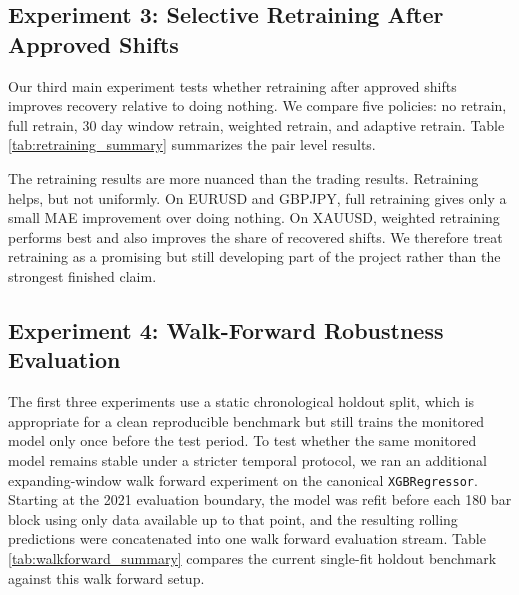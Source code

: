 \documentclass[11pt]{article}
\begin{document}
\subsection{Experiment 3: Selective Retraining After Approved Shifts}
Our third main experiment tests whether retraining after approved shifts improves recovery relative to doing nothing. We compare five policies: no retrain, full retrain, 30 day window retrain, weighted retrain, and adaptive retrain. Table \ref{tab:retraining_summary} summarizes the pair level results.

\begin{table}[H]
\centering
\caption{Selective retraining summary. Lower MAE is better and lower recovery bars are better.}
\label{tab:retraining_summary}
\end{table}

The retraining results are more nuanced than the trading results. Retraining helps, but not uniformly. On EURUSD and GBPJPY, full retraining gives only a small MAE improvement over doing nothing. On XAUUSD, weighted retraining performs best and also improves the share of recovered shifts. We therefore treat retraining as a promising but still developing part of the project rather than the strongest finished claim.

\subsection{Experiment 4: Walk-Forward Robustness Evaluation}
The first three experiments use a static chronological holdout split, which is appropriate for a clean reproducible benchmark but still trains the monitored model only once before the test period. To test whether the same monitored model remains stable under a stricter temporal protocol, we ran an additional expanding-window walk forward experiment on the canonical \texttt{XGBRegressor}. Starting at the 2021 evaluation boundary, the model was refit before each 180 bar block using only data available up to that point, and the resulting rolling predictions were concatenated into one walk forward evaluation stream. Table \ref{tab:walkforward_summary} compares the current single-fit holdout benchmark against this walk forward setup.
\end{document}
